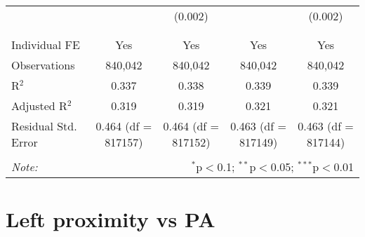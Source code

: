 \documentclass[
]{article}
\begin{document}
\begin{table}[!htbp]
{\begin{tabular}{@{\extracolsep{5pt}}lcccc}
  &  & (0.002) &  & (0.002) \\ 
  & & & & \\ 
\hline \\[-1.8ex] 
Individual FE & Yes & Yes & Yes & Yes \\ 
Observations & 840,042 & 840,042 & 840,042 & 840,042 \\ 
R$^{2}$ & 0.337 & 0.338 & 0.339 & 0.339 \\ 
Adjusted R$^{2}$ & 0.319 & 0.319 & 0.321 & 0.321 \\ 
Residual Std. Error & 0.464 (df = 817157) & 0.464 (df = 817152) & 0.463 (df = 817149) & 0.463 (df = 817144) \\ 
\hline 
\hline \\[-1.8ex] 
\textit{Note:}  & \multicolumn{4}{r}{$^{*}$p$<$0.1; $^{**}$p$<$0.05; $^{***}$p$<$0.01} \\ 
\end{tabular}
} 
\end{table} 
\newpage
\section{Left proximity vs PA}
\end{document}
